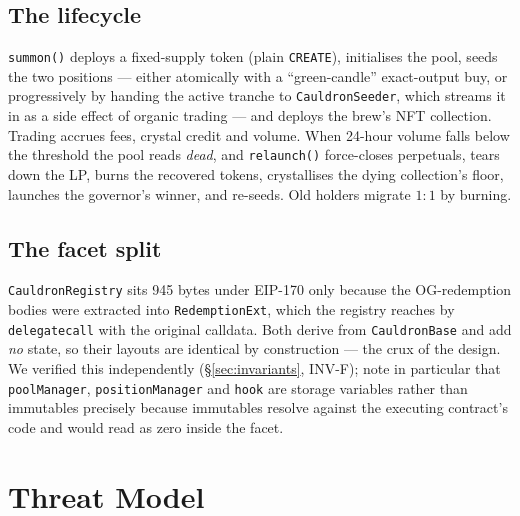 \documentclass[10pt,a4paper]{article}
\newcommand{\code}[1]{\texttt{\small #1}}
\begin{document}
\subsection{The lifecycle}
\code{summon()} deploys a fixed-supply token (plain \code{CREATE}), initialises the pool,
seeds the two positions --- either atomically with a ``green-candle'' exact-output buy, or
progressively by handing the active tranche to \code{CauldronSeeder}, which streams it in
as a side effect of organic trading --- and deploys the brew's NFT collection. Trading
accrues fees, crystal credit and volume. When 24-hour volume falls below the threshold the
pool reads \emph{dead}, and \code{relaunch()} force-closes perpetuals, tears down the LP,
burns the recovered tokens, crystallises the dying collection's floor, launches the
governor's winner, and re-seeds. Old holders migrate $1{:}1$ by burning.

\subsection{The facet split}
\code{CauldronRegistry} sits 945 bytes under EIP-170 only because the OG-redemption
bodies were extracted into \code{RedemptionExt}, which the registry reaches by
\code{delegatecall} with the original calldata. Both derive from \code{CauldronBase} and
add \emph{no} state, so their layouts are identical by construction --- the crux of the
design. We verified this independently (\S\ref{sec:invariants}, INV-F); note in particular
that \code{poolManager}, \code{positionManager} and \code{hook} are storage variables
rather than immutables precisely because immutables resolve against the executing
contract's code and would read as zero inside the facet.

\section{Threat Model}
\end{document}
